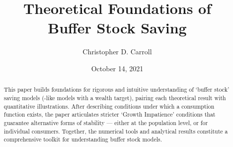 \documentclass[BufferStockTheory]{subfiles}
\begin{document}
\providecommand{\versn}{pdf} %
\ifthenelse{\boolean{Web}}{    %
  \renewcommand{\versn}{Web}     %
  \renewcommand{\rootFromOut}{.} %
}{}  %


\title{Theoretical Foundations of \\ Buffer Stock Saving}

\author{Christopher D. Carroll\authNum}



\renewcommand{\forcedate}{October 14, 2021}\date{\forcedate}

\maketitle
\hypertarget{abstract}{}
\begin{abstract}
This paper builds foundations for rigorous and intuitive understanding of `buffer stock' saving models (\cite{bewleyPIH}-like models with a wealth target), pairing each theoretical result with quantitative illustrations.  After describing conditions under which a consumption function exists, the paper articulates stricter `Growth Impatience' conditions that guarantee alternative forms of stability --- either at the population level, or for individual consumers.  Together, the numerical tools and analytical results constitute a comprehensive toolkit for understanding buffer stock models.
\end{abstract}


\hypertarget{links}{}
\end{document}
